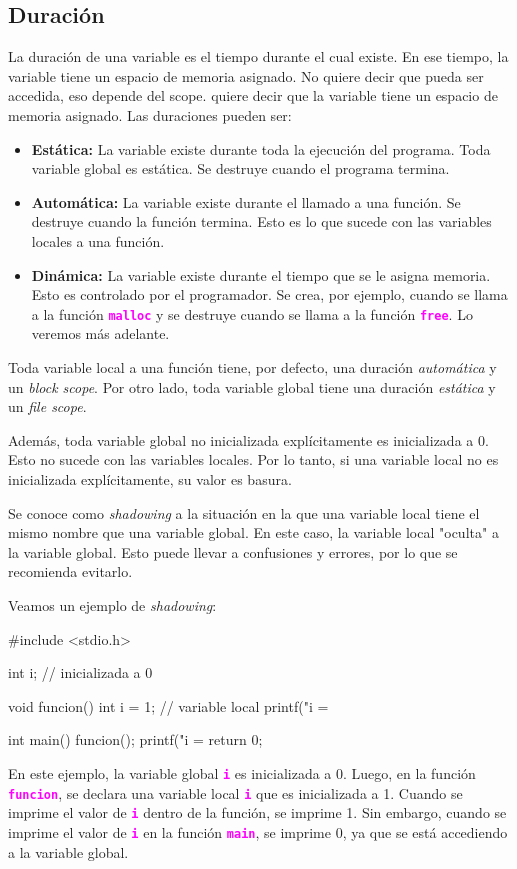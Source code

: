 \documentclass[]{scrartcl}
\newcommand{\hl}[1]{\textcolor{magenta}{\textbf{\texttt{#1}}}}
\begin{document}
\subsection*{Duración}
La duración de una variable es el tiempo durante el cual existe. En ese tiempo, la variable tiene un espacio de memoria asignado. No quiere decir que pueda ser accedida, eso depende del scope. quiere decir que la variable tiene un espacio de memoria asignado.
Las duraciones pueden ser:
\begin{itemize}
    \item \textbf{Estática:} La variable existe durante toda la ejecución del programa. Toda variable global es estática. Se destruye cuando el programa termina.
    \item \textbf{Automática:} La variable existe durante el llamado a una función. Se destruye cuando la función termina. Esto es lo que sucede con las variables locales a una función.
    \item \textbf{Dinámica:} La variable existe durante el tiempo que se le asigna memoria. Esto es controlado por el programador. Se crea, por ejemplo, cuando se llama a la función \hl{malloc} y se destruye cuando se llama a la función \hl{free}. Lo veremos más adelante.
\end{itemize}

Toda variable local a una función tiene, por defecto, una duración \textit{automática} y un \textit{block scope}. Por otro lado, toda variable global tiene una duración \textit{estática} y un \textit{file scope}.

Además, toda variable global no inicializada explícitamente es inicializada a 0. Esto no sucede con las variables locales. Por lo tanto, si una variable local no es inicializada explícitamente, su valor es basura.

Se conoce como \textit{shadowing} a la situación en la que una variable local tiene el mismo nombre que una variable global. En este caso, la variable local "oculta" a la variable global. Esto puede llevar a confusiones y errores, por lo que se recomienda evitarlo.

Veamos un ejemplo de \textit{shadowing}:
\begin{cbox}[]{}
  #include <stdio.h>

  int i; // inicializada a 0

  void funcion() {
    int i = 1; // variable local
    printf("i = %
  }

  int main() {
    funcion();
    printf("i = %
    return 0;
  }
\end{cbox}
En este ejemplo, la variable global \hl{i} es inicializada a 0. Luego, en la función \hl{funcion}, se declara una variable local \hl{i} que es inicializada a 1. Cuando se imprime el valor de \hl{i} dentro de la función, se imprime 1. Sin embargo, cuando se imprime el valor de \hl{i} en la función \hl{main}, se imprime 0, ya que se está accediendo a la variable global.
\end{document}
